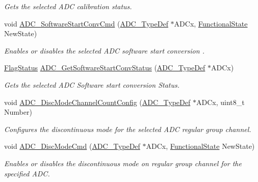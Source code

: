 \begin{DoxyCompactItemize}
\begin{DoxyCompactList}\small\item\em Gets the selected A\+DC calibration status. \end{DoxyCompactList}\item 
void \hyperlink{group___a_d_c___private___functions_ga694130a8d1ad3c8877b7eddb29611b30}{A\+D\+C\+\_\+\+Software\+Start\+Conv\+Cmd} (\hyperlink{struct_a_d_c___type_def}{A\+D\+C\+\_\+\+Type\+Def} $\ast$A\+D\+Cx, \hyperlink{group___exported__types_gac9a7e9a35d2513ec15c3b537aaa4fba1}{Functional\+State} New\+State)
\begin{DoxyCompactList}\small\item\em Enables or disables the selected A\+DC software start conversion . \end{DoxyCompactList}\item 
\hyperlink{group___exported__types_ga89136caac2e14c55151f527ac02daaff}{Flag\+Status} \hyperlink{group___a_d_c___private___functions_gaf1119583782ecbcec380efcb7eb74883}{A\+D\+C\+\_\+\+Get\+Software\+Start\+Conv\+Status} (\hyperlink{struct_a_d_c___type_def}{A\+D\+C\+\_\+\+Type\+Def} $\ast$A\+D\+Cx)
\begin{DoxyCompactList}\small\item\em Gets the selected A\+DC Software start conversion Status. \end{DoxyCompactList}\item 
void \hyperlink{group___a_d_c___private___functions_ga6eb241ba82d67d1371136c9132083937}{A\+D\+C\+\_\+\+Disc\+Mode\+Channel\+Count\+Config} (\hyperlink{struct_a_d_c___type_def}{A\+D\+C\+\_\+\+Type\+Def} $\ast$A\+D\+Cx, uint8\+\_\+t Number)
\begin{DoxyCompactList}\small\item\em Configures the discontinuous mode for the selected A\+DC regular group channel. \end{DoxyCompactList}\item 
void \hyperlink{group___a_d_c___private___functions_ga1909649d10253ce88d986ffbb94a4be6}{A\+D\+C\+\_\+\+Disc\+Mode\+Cmd} (\hyperlink{struct_a_d_c___type_def}{A\+D\+C\+\_\+\+Type\+Def} $\ast$A\+D\+Cx, \hyperlink{group___exported__types_gac9a7e9a35d2513ec15c3b537aaa4fba1}{Functional\+State} New\+State)
\begin{DoxyCompactList}\small\item\em Enables or disables the discontinuous mode on regular group channel for the specified A\+DC. \end{DoxyCompactList}\item 

\end{DoxyCompactItemize}
